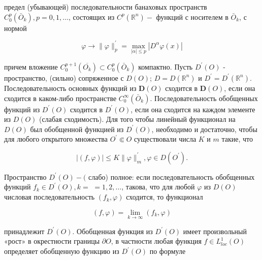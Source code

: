 \documentclass[10pt]{article}
\begin{document}
предел (убывающей) последовательности банаховых пространств $C_{0}^{p}\left(\bar{O}_{k}\right), p=0,1, \ldots$, состоящих из $C^{p}\left(\mathbb{R}^{n}\right)-$ функций с носителем в $\bar{O}_{k}$, с нормой



\[

\varphi \rightarrow\|\varphi\|_{p}^{\prime}=\max _{|\alpha| \leqslant p}\left|D^{\alpha} \varphi(x)\right|

\]



причем вложение $C_{0}^{p+1}\left(\overline{O_{k}}\right) \subset C_{0}^{p}\left(\bar{O}_{k}\right)$ компактно. Пусть $D^{\prime}(O)$ - пространство, (сильно) сопряженное с $D(O)$; $D=D\left(\mathbb{R}^{n}\right)$ и $D^{\prime}=D^{\prime}\left(\mathbb{R}^{n}\right)$. Последовательность основных функций из $\boldsymbol{D}(O)$ сходится в $\boldsymbol{D}(O)$, если она сходится в каком-либо пространстве $C_{0}^{\infty}\left(\bar{O}_{k}\right)$. Последовательность обобщенных функций из $D^{\prime}(O)$ сходится в $D^{\prime}(O)$, если она сходится на каждом элементе из $D(O)$ (слабая сходимость). Для того чтобы линейный функционал на $D(O)$ был обобщенной функцией из $D^{\prime}(O)$, необходимо и достаточно, чтобы для любого открытого множества $O^{\prime} \Subset O$ существовали числа $K$ и $m$ такие, что



\[

|(f, \varphi)| \leqslant K\|\varphi\|_{m}^{\prime}, \varphi \in D\left(O^{\prime}\right) .

\]



Пространство $D^{\prime}(O)-($ слабо) полное: если последовательность обобщенных функций $f_{k} \in D^{\prime}(O), k=$ $=1,2, \ldots$, такова, что для любой $\varphi$ из $D(O)$ числовая последовательность $\left(f_{k}, \varphi\right)$ сходится, то функционал



\[

(f, \varphi)=\lim _{k \rightarrow \infty}\left(f_{k}, \varphi\right)

\]



принадлежит $D^{\prime}(O)$. Обобщенная функция из $D^{\prime}(O)$ имеет произвольный «рост» в окрестности границы $\partial O$, в частности любая функция $f \in L_{l o c}^{1}(O)$ определяет обобщенную функцию из $D^{\prime}(O)$ по формуле
\end{document}
